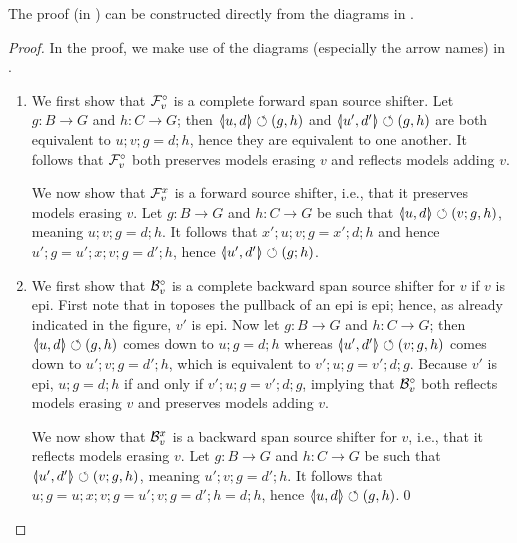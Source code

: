 %
\iffest
The proof (in ) can be constructed directly from the diagrams in .
\fi
\begin{fullorname}
\begin{proof}
In the proof, we make use of the diagrams (especially the arrow names) in .
\begin{enumerate}
\item We first show that $\mathcal{F}_v^\circ$ is a complete forward span source shifter. Let $g:B\to G$ and $h:C\to G$; then $\spanof{u}{d}\commutes (g,h)$ and $\spanof{u'}{d'}\commutes (g,h)$ are both equivalent to $u;v;g=d;h$, hence they are equivalent to one another. It follows that $\mathcal{F}_v^\circ$ both  preserves models erasing $v$ and reflects models adding $v$.

We now show that $\mathcal{F}_v^x$ is a forward source shifter, i.e., that it preserves models erasing $v$. Let $g:B\to G$ and $h:C\to G$ be such that $\spanof{u}{d}\commutes (v;g,h)$, meaning $u;v;g=d;h$. It follows that $x';u;v;g=x';d;h$ and hence $u';g=u';x;v;g=d';h$, hence $\spanof{u'}{d'}\commutes (g;h)$.

\item We first show that $\mathcal{B}_v^\circ$ is a complete backward span source shifter for $v$ if $v$ is epi. First note that in toposes the pullback of an epi is epi; hence, as already indicated in the figure, $v'$ is epi. Now let $g:B\to G$ and $h:C\to G$; then $\spanof{u}{d}\commutes (g,h)$ comes down to $u;g=d;h$ whereas $\spanof{u'}{d'}\commutes (v;g,h)$ comes down to $u';v;g=d';h$, which is equivalent to $v';u;g=v';d;g$. Because $v'$ is epi, $u;g=d;h$ if and only if $v';u;g=v';d;g$, implying that $\mathcal{B}_v^\circ$ both reflects models erasing $v$ and preserves models adding $v$.

We now show that $\mathcal{B}_v^x$ is a backward span source shifter for $v$, i.e., that it reflects models erasing $v$. Let $g:B\to G$ and $h:C\to G$ be such that $\spanof{u'}{d'}\commutes (v;g,h)$, meaning $u';v;g=d';h$. It follows that $u;g=u;x;v;g=u';v;g=d';h=d;h$, hence $\spanof u d\commutes (g,h)$.\qed
\end{enumerate}
\end{proof}
\end{fullorname}
%

